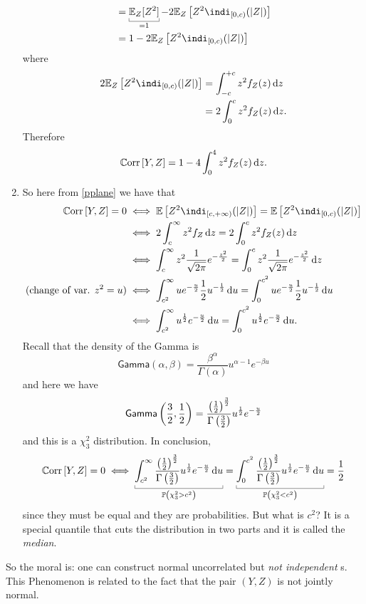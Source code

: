 \begin{enumerate}
\begin{align*}
		&=\ubracketthin{\evs_{Z}[Z^{2}]}_{=1}-2\evs_{Z}\left[Z^{2}\indi_{[0,c)}(|Z|)\right]\\
		&=1-2\evs_{Z}\left[Z^{2}\indi_{[0,c)}(|Z|)\right]\\
	\end{align*}
	where
	\begin{align*}
		2\evs_{Z}\left[Z^{2}\indi_{[0,c)}(|Z|)\right]&=\int_{-c}^{+c}z^{2}f_{Z}(z)\dz\\
		&=2\int_{0}^{c}z^{2}f_{Z}(z)\dz.
	\end{align*}
	Therefore 
	\begin{equation*}
		\mathbb{C}\mathrm{orr}\,[Y,Z]=1-4\int_{0}^{4}z^{2}f_{Z}(z)\mathop{}\!\mathrm{d} z.
	\end{equation*}
	\item So here from \ref{pplane} we have that 
	\begin{align*}
		\corr[Y,Z]=0&\iff\ev{Z^{2}\indi_{[c,+\infty)}(|Z|)}=\ev{Z^{2}\indi_{[0,c)}(|Z|)}\\
		&\iff 2\int_{c}^{\infty}z^{2}f_{Z}\dz=2\int_{0}^{c}z^{2}f_{Z}(z)\dz\\
		&\iff\int_{c}^{\infty}z^{2}\frac{1}{\sqrt{2\pi}}e^{-\frac{z^{2}}{2}}=\int_{0}^{c}z^{2}\frac{1}{\sqrt{2\pi}}e^{-\frac{z^{2}}{2}}\dz\\
		\text{(change of var. $z^{2}=u$)}&\iff\int_{c^{2}}^{\infty}ue^{-\frac{u}{2}}\unmezz u^{-\unmezz}\du=\int_{0}^{c^{2}}ue^{-\frac{u}{2}}\unmezz u^{-\unmezz}\du\\
		&\iff\int_{c^{2}}^{\infty}u^{\unmezz}e^{-\frac{u}{2}}\du=\int_{0}^{c^{2}}u^{\unmezz}e^{-\frac{u}{2}}\du.
	\end{align*}
	Recall that the density of the Gamma is
	\begin{equation*}
		\mathsf{Gamma}(\alpha,\beta)=\frac{\beta^{\alpha}}{\Gamma(\alpha)}u^{\alpha-1}e^{-\beta u}
	\end{equation*}
	and here we have
	\begin{equation*}
		\mathsf{Gamma}\left(\frac{3}{2},\frac{1}{2}\right)=\frac{\left(\frac{1}{2}\right)^{\frac{3}{2}}}{\Gamma\left(\frac{3}{2}\right)}u^{\frac{1}{2}}e^{-\frac{u}{2}}
	\end{equation*}
	and this is a $\chi^{2}_{3}$ distribution. In conclusion,
	\begin{equation*}
		\corr[Y,Z]=0\iff\ubracketthin{\int_{c^{2}}^{\infty}\frac{\left(\unmezz\right)^{\frac{3}{2}}}{\Gamma\left(\frac{3}{2}\right)}u^{\unmezz}e^{-\frac{u}{2}}\du}_{\pr\left(\chi^{2}_{3}>c^{2}\right)}=\ubracketthin{\int_{0}^{c^{2}}\frac{\left(\unmezz\right)^{\frac{3}{2}}}{\Gamma\left(\frac{3}{2}\right)}u^{\unmezz}e^{-\frac{u}{2}}\du}_{\pr\left(\chi^{2}_{3}<c^{2}\right)}=\unmezz
	\end{equation*}
	since they must be equal and they are probabilities. But what is $c^{2}$? It is a special quantile that cuts the distribution in two parts and it is called the \emph{median}.
\end{enumerate}
So the moral is: one can construct normal uncorrelated but \textit{not independent} \rv s. This Phenomenon is related to the fact that the pair $(Y,Z)$ is not jointly normal.
